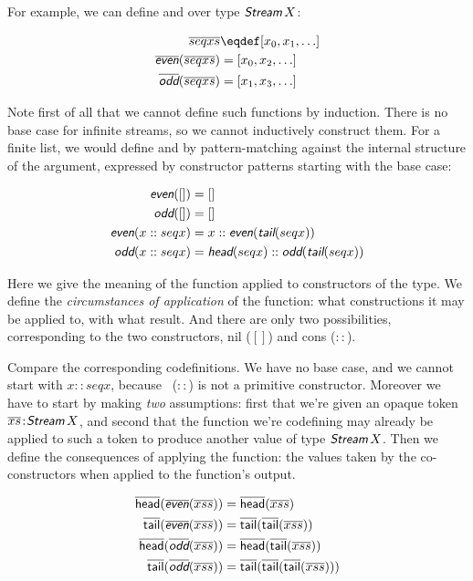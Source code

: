\documentclass{article}
\begin{document}
For example, we can define  and  over type
\(\Stream\, X\):

\begin{align}
  \coseq{seq{x}} & \defeq [x_0, x_1, \ldots] \\
  \codefn{even}(\coseq{seq{x}}) & = [x_0, x_2, \ldots] \\
  \codefn{odd}(\coseq{seq{x}})  & = [x_1, x_3, \ldots]
\end{align}

Note first of all that we cannot define such functions by induction.
There is no base case for infinite streams, so we cannot inductively
construct them. For a finite list, we would define  and
 by pattern-matching against the internal structure of the
argument, expressed by constructor patterns starting with the base case:

\begin{align}
  \defn{even}([]) & = [] \\
  \defn{odd}([]) & = [] \\
  \defn{even}(x::seq{x}) & = x::\defn{even}(\tail(seq{x})) \\
  \defn{odd}(x::seq{x}) & = \head(seq{x})::\defn{odd}(\tail(seq{x}))
\end{align}

Here we give the meaning of the function applied to constructors of
the type. We define the \textit{circumstances of application} of the
function: what constructions it may be applied to, with what result.
And there are only two possibilities, corresponding to the two
constructors, nil (\([]\)) and cons (\(::\)).

Compare the corresponding codefinitions. We have no base case, and we
cannot start with \(x::seq{x}\), because \cons\ (\(::\)) is not a
primitive constructor. Moreover we have to start by making
\textit{two} assumptions: first that we're given an opaque token
\(\tj{\coseq{x}}{\Stream\,X}\), and second that the function we're
codefining may already be applied to such a token to produce another
value of type \(\Stream\, X\). Then we define the consequences of
applying the function: the values taken by the co-constructors when
applied to the function's output.

\begin{align}
  \cohead(\codefn{even}(\coseq{xs})) & = \cohead(\coseq{xs}) \\
  \cotail(\codefn{even}(\coseq{xs})) & = \cotail(\cotail(\coseq{xs})) \\
  \cohead(\codefn{odd}(\coseq{xs})) & = \cohead(\cotail(\coseq{xs})) \\
  \cotail(\codefn{odd}(\coseq{xs})) & = \cotail(\cotail(\cotail(\coseq{xs})))
\end{align}
\end{document}
